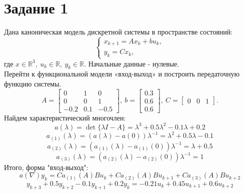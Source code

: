 \documentclass[12pt]{article}
\begin{document}
\section*{Задание 1}
Дана каноническая модель дискретной системы в пространстве состояний:
\[
    \begin{cases}
        x_{k+1} = A x_k + b u_k, \\
        y_k = C x_k,
    \end{cases}
\]
где $x \in \mathbb{R}^3, \ u_k \in \mathbb{R}, \ y_k \in \mathbb{R}.$ Начальные данные - нулевые. \\
Перейти к функциональной модели «вход-выход» и построить передаточную функцию системы.
\[
    A = \begin{bmatrix}
        0 & 1 & 0 \\
        0 & 0 & 1 \\
        -0.2 & 0.1 & -0.5 
    \end{bmatrix}, \ 
    b = \begin{bmatrix}
        0.3 \\
        0.6 \\
        0.6
    \end{bmatrix}, \ 
    C = \begin{bmatrix}
        0 & 0 & 1
    \end{bmatrix}.
\]
Найдем характеристический многочлен:
\[
    a(\lambda) = \det \{\lambda I - A\} = \lambda^3 + 0.5 \lambda^2 - 0.1 \lambda + 0.2
\]
\[
    a_{(1)}(\lambda) = (a(\lambda) - a(0)) \lambda^{-1} = \lambda^2 + 0.5 \lambda - 0.1
\]
\[
    a_{(2)}(\lambda) = (a_{(1)}(\lambda) - a_{(1)}(0)) \lambda^{-1} = \lambda + 0.5
\]
\[
    a_{(3)}(\lambda) = (a_{(2)}(\lambda) - a_{(2)}(0)) \lambda^{-1} = 1
\]
Итого, форма "вход-выход":
\[
    a(\nabla) y_k = C a_{(1)}(A) B u_k + C a_{(2)}(A) B u_{k+1} + C a_{(3)}(A) B u_{k+2}
\]
\[
    y_{k+3} + 0.5 y_{k+2} - 0.1 y_{k+1} + 0.2 y_k = -0.21 u_k + 0.45 u_{k+1} + 0.6 u_{k+2}
\]
\end{document}
